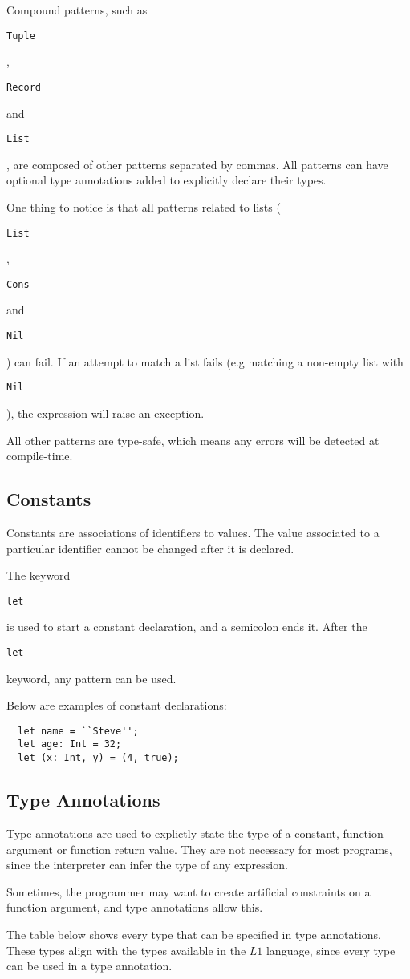 \documentclass{article}
\def\code#1{\begin{footnotesize}\texttt{#1}\end{footnotesize}}
\begin{document}
\medskip

Compound patterns, such as \code{Tuple}, \code{Record} and \code{List}, are composed of other patterns separated by commas.
All patterns can have optional type annotations added to explicitly declare their types.

\smallskip

One thing to notice is that all patterns related to lists (\code{List}, \code{Cons} and \code{Nil}) can fail.
If an attempt to match a list fails (e.g matching a non-empty list with \code{Nil}), the expression will raise an exception.

All other patterns are type-safe, which means any errors will be detected at compile-time.

\subsection{Constants}

Constants are associations of identifiers to values.
The value associated to a particular identifier cannot be changed after it is declared.

The keyword \code{let} is used to start a constant declaration, and a semicolon ends it.
After the \code{let} keyword, any pattern can be used.

Below are examples of constant declarations:

\begin{lstlisting}
  let name = ``Steve'';
  let age: Int = 32;
  let (x: Int, y) = (4, true);
\end{lstlisting}

\subsection{Type Annotations}

Type annotations are used to explictly state the type of a constant, function argument or function return value.
They are not necessary for most programs, since the interpreter can infer the type of any expression.

Sometimes, the programmer may want to create artificial constraints on a function argument, and type annotations allow this.

The table below shows every type that can be specified in type annotations.
These types align with the types available in the $L1$ language, since every type can be used in a type annotation.
\end{document}
